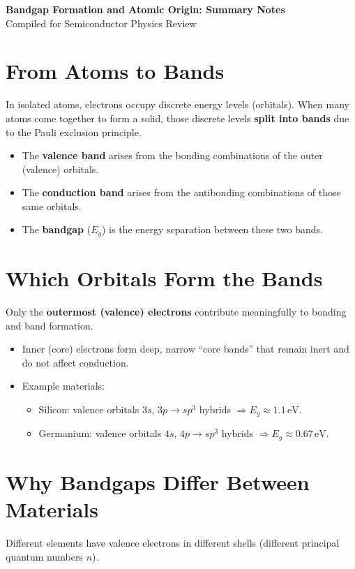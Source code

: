 \documentclass[12pt]{article}
\begin{document}
	
	\begin{center}
		{\LARGE \textbf{Bandgap Formation and Atomic Origin: Summary Notes}}\\[0.5em]
		{\large Compiled for Semiconductor Physics Review}
	\end{center}
	\vspace{1em}
	
	\section{From Atoms to Bands}
	In isolated atoms, electrons occupy discrete energy levels (orbitals). When many atoms come together to form a solid, those discrete levels \textbf{split into bands} due to the Pauli exclusion principle.
	
	\begin{itemize}
		\item The \textbf{valence band} arises from the bonding combinations of the outer (valence) orbitals.
		\item The \textbf{conduction band} arises from the antibonding combinations of those same orbitals.
		\item The \textbf{bandgap} ($E_g$) is the energy separation between these two bands.
	\end{itemize}
	
	\section{Which Orbitals Form the Bands}
	Only the \textbf{outermost (valence) electrons} contribute meaningfully to bonding and band formation.
	
	\begin{itemize}
		\item Inner (core) electrons form deep, narrow ``core bands'' that remain inert and do not affect conduction.
		\item Example materials:
		\begin{itemize}
			\item Silicon: valence orbitals $3s$, $3p \rightarrow sp^3$ hybrids $\Rightarrow E_g \approx 1.1\,\text{eV}$.
			\item Germanium: valence orbitals $4s$, $4p \rightarrow sp^3$ hybrids $\Rightarrow E_g \approx 0.67\,\text{eV}$.
		\end{itemize}
	\end{itemize}
	
	\section{Why Bandgaps Differ Between Materials}
	Different elements have valence electrons in different shells (different principal quantum numbers $n$).
	
\end{document}
